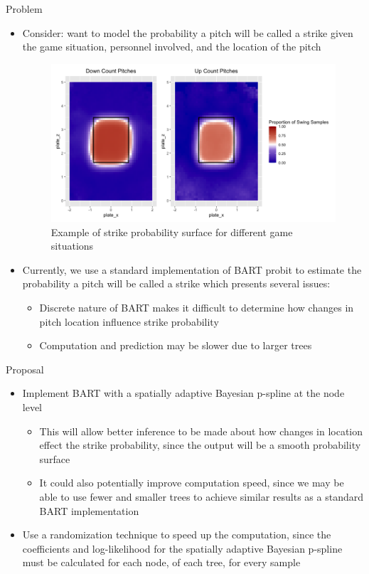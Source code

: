\documentclass{beamer}
\begin{document}
\small

\begin{frame}{Problem}
    \begin{itemize}
        \item Consider: want to model the probability a pitch will be called a strike given the game situation, personnel involved, and the location of the pitch
        \begin{figure}
            \centering
            \includegraphics[width=.5\textwidth]{counts.png}
            \caption{Example of strike probability surface for different game situations}
        \end{figure}
        \item Currently, we use a standard implementation of BART probit to estimate the probability a pitch will be called a strike which presents several issues:
        \begin{itemize}
            \item Discrete nature of BART makes it difficult to determine how changes in pitch location influence strike probability
            \item Computation and prediction may be slower due to larger trees
        \end{itemize}
    \end{itemize} 
\end{frame}

\begin{frame}{Proposal}
    \begin{itemize}
        \item Implement BART with a spatially adaptive Bayesian p-spline at the node level
        \begin{itemize}
            \item This will allow better inference to be made about how changes in location effect the strike probability, since the output will be a smooth probability surface
            \item It could also potentially improve computation speed, since we may be able to use fewer and smaller trees to achieve similar results as a standard BART implementation
        \end{itemize}
        \item Use a randomization technique to speed up the computation, since the coefficients and log-likelihood for the spatially adaptive Bayesian p-spline must be calculated for each node, of each tree, for every sample
    \end{itemize} 
\end{frame}
\end{document}
